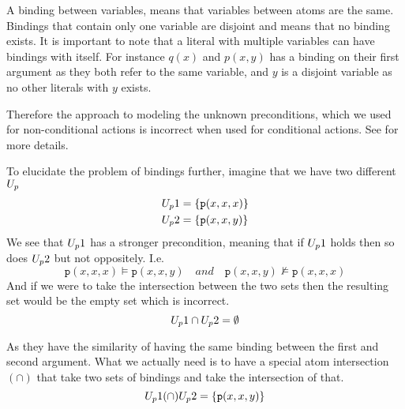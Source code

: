 \documentclass[\master/Master.tex]{subfiles}
\begin{document}
\begin{definition}[Binding]\label{def:ca:binding}
    A binding between variables, means that variables between atoms are the same.
	Bindings that contain only one variable are disjoint and means that no binding exists.
	It is important to note that a literal with multiple variables can have bindings with itself.
	For instance $q(x)$ and $p(x,y)$ has a binding on their first argument as they both refer to the same variable, and $y$ is a disjoint variable as no other literals with $y$ exists.
\end{definition}
Therefore the approach to modeling the unknown preconditions, which we used for non-conditional actions is incorrect when used for conditional actions. See  for more details.



\begin{example}\label{ex:ca:nonbinding-intersection-model}
    To elucidate the problem of bindings further, imagine that we have two different $U_p$
    \begin{align*}
        U_p1 &= \{ \texttt{p}(x, x, x) \} \\
        U_p2 &= \{ \texttt{p}(x, x, y) \}
    \end{align*}
    We see that $U_p1$ has a stronger precondition, meaning that if $U_p1$ holds then so does $U_p2$ but not oppositely. I.e.\ 
    \begin{equation*}
    \texttt{p}(x, x, x) \vDash \texttt{p}(x, x, y)  \quad and \quad
     \texttt{p}(x, x, y) \nvDash \texttt{p}(x, x, x) 
    \end{equation*}
    And if we were to take the intersection between the two sets then the resulting set would be the empty set which is incorrect.
    \begin{equation*}
    	U_p1 \cap U_p2 = \emptyset
    \end{equation*}
    
     As they have the similarity of having the same binding between the first and second argument. 
     What we actually need is to have a special atom intersection $(\cap)$ that take two sets of bindings and take the intersection of that.
     \begin{equation*}
     	U_p1 (\cap) U_p2 = \{ \texttt{p}(x, x, y) \}
     \end{equation*}
\end{example}
\end{document}
